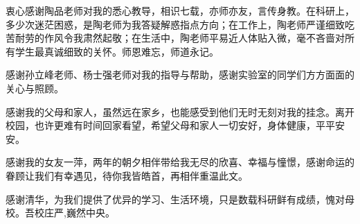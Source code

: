 \begin{ack}

衷心感谢陶品老师对我的悉心教导，相识七载，亦师亦友，言传身教。在科研上，多少次迷茫困惑，是陶老师为我答疑解惑指点方向；在工作上，陶老师严谨细致吃苦耐劳的作风令我肃然起敬；在生活中，陶老师平易近人体贴入微，毫不吝啬对所有学生最真诚细致的关怀。师恩难忘，师道永记。

感谢孙立峰老师、杨士强老师对我的指导与帮助，感谢实验室的同学们方方面面的关心与照顾。

感谢我的父母和家人，虽然远在家乡，也能感受到他们无时无刻对我的挂念。离开校园，也许更难有时间回家看望，希望父母和家人一切安好，身体健康，平平安安。

感谢我的女友一萍，两年的朝夕相伴带给我无尽的欣喜、幸福与憧憬，感谢命运的眷顾让我们有幸遇见，待你我皆皓首，再相伴重温此文。

感谢清华，为我们提供了优异的学习、生活环境，只是数载科研鲜有成绩，愧对母校。吾校庄严,巍然中央。

\end{ack}
